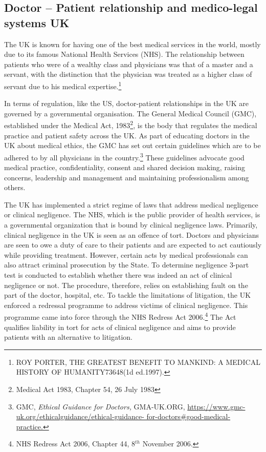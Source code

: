 \begin{multicols}{2}
\subsection*{Doctor – Patient relationship and medico-legal systems UK}

\noi
The UK is known for having one of the best medical services in the world, mostly due to its famous National Health Services (NHS). The relationship between patients who were of a wealthy class and physicians was that of a master and a servant, with the distinction that the physician was treated as a higher class of servant due to his medical
expertise.\footnote{ROY PORTER, THE GREATEST BENEFIT TO MANKIND: A MEDICAL HISTORY OF HUMANITY73648(1d ed.1997).}

\noi
In terms of regulation, like the US, doctor-patient relationships in the UK are governed
by a governmental organisation. The General Medical Council (GMC), established
under the Medical Act, 1983\footnote{Medical Act 1983, Chapter 54, 26 July 1983}, is the body that regulates the medical practice and patient safety across the UK. As part of educating doctors in the UK about medical ethics, the GMC has set out certain guidelines which are to be adhered to by all physicians in the country.\footnote{GMC, \textit{Ethical Guidance for Doctors,} GMA-UK.ORG, \url{https://www.gmc-uk.org/ethicalguidance/ethical-guidance- for-doctors#good-medical-practice.}} These guidelines advocate good medical practice, confidentiality, consent and shared decision making, raising concerns, leadership and management and maintaining professionalism among others.

\noi
The UK has implemented a strict regime of laws that address medical negligence or
clinical negligence. The NHS, which is the public provider of health services, is a
governmental organization that is bound by clinical negligence laws. Primarily, clinical
negligence in the UK is seen as an offence of tort. Doctors and physicians are seen to
owe a duty of care to their patients and are expected to act cautiously while providing
treatment. However, certain acts by medical professionals can also attract criminal
prosecution by the State. To determine negligence 3-part test is conducted to establish
whether there was indeed an act of clinical negligence or not. The procedure, therefore,
relies on establishing fault on the part of the doctor, hospital, etc. To tackle the
limitations of litigation, the UK enforced a redressal programme to address victims of
clinical negligence. This programme came into force through the NHS Redress Act 2006.\footnote{NHS Redress Act 2006, Chapter 44, 8$^{th}$ November 2006.} The Act qualifies liability in tort for acts of clinical negligence and aims to provide patients with an alternative to litigation.


\end{multicols}
